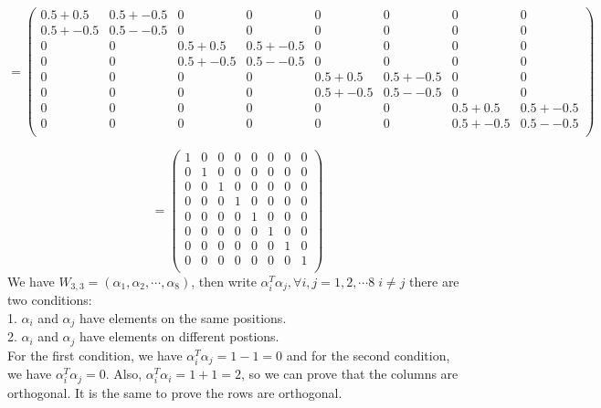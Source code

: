 \documentclass[12pt]{article}
\begin{document}
\[
= 
\begin{pmatrix}
0.5 + 0.5  & 0.5 + -0.5 & 0          & 0          & 0          & 0          & 0          & 0          \\
0.5 + -0.5 & 0.5 --0.5  & 0          & 0          & 0          & 0          & 0          & 0          \\
0          & 0          & 0.5 + 0.5  & 0.5 +-0.5  & 0          & 0          &  0          & 0          \\
0          & 0          & 0.5 +-0.5  & 0.5 --0.5  & 0          & 0          & 0          & 0          \\
0          & 0          & 0          & 0          & 0.5 + 0.5  & 0.5 +-0.5  & 0          & 0          \\
0          & 0          & 0          & 0          & 0.5 +-0.5  & 0.5 --0.5  & 0          & 0          \\
0          & 0          & 0          & 0          & 0          & 0          & 0.5 + 0.5  & 0.5 +-0.5  \\
0          & 0          & 0          & 0          & 0          & 0             & 0.5 +-0.5  &  0.5 --0.5\\ 
\end{pmatrix}
\] 

\[
=
\begin{pmatrix}
1  & 0 & 0          & 0          & 0          & 0          & 0          & 0          \\
0 & 1  & 0          & 0          & 0          & 0          & 0          & 0          \\
0          & 0          & 1  & 0  & 0          & 0          &  0          & 0          \\
0          & 0          & 0  & 1 & 0          & 0          & 0          & 0          \\
0          & 0          & 0          & 0          & 1  & 0  & 0          & 0          \\
0          & 0          & 0          & 0          & 0  & 1  & 0          & 0          \\
0          & 0          & 0          & 0          & 0          & 0          & 1  & 0  \\
0          & 0          & 0          & 0          & 0          & 0             & 0  &  1\\ 
\end{pmatrix}
\] 
We have $W_{3, 3} = (\alpha_1, \alpha_2, \cdots, \alpha_8)$, then write $\alpha_i^T\alpha_j, \forall i,j = 1,2,\cdots8 \; i \neq j$ there are two conditions: \\
1. $\alpha_i$ and $\alpha_j$ have elements on the same positions. \\ 
2. $\alpha_i$ and $\alpha_j$ have elements on different postions. \\
For the first condition, we have $\alpha_i^T\alpha_j = 1-1=0$ and for the second condition, we have $\alpha_i^T\alpha_j = 0$. Also, $\alpha_i^T\alpha_i = 1 + 1 = 2$, so we can prove that the columns are orthogonal. It
is the same to prove the rows are orthogonal.
\end{document}
